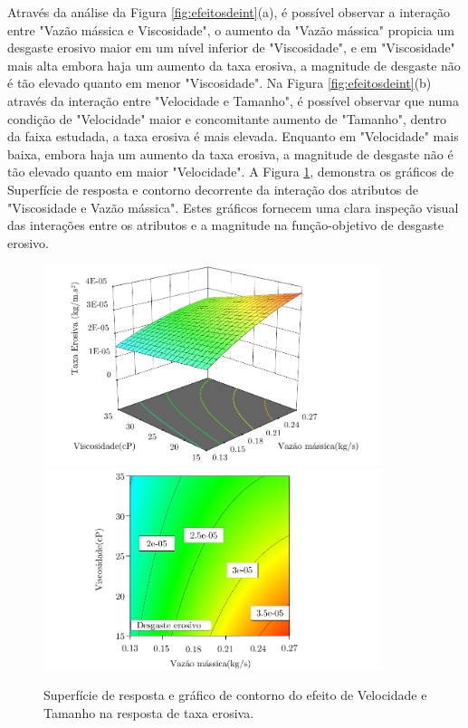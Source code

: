 Através da análise da Figura \ref{fig:efeitosdeint}(a), é possível observar a interação entre "Vazão mássica e Viscosidade", o aumento da "Vazão mássica" propicia um desgaste erosivo maior em um nível inferior de "Viscosidade", e em "Viscosidade" mais alta embora haja um aumento da taxa erosiva, a magnitude de desgaste não é tão elevado quanto em menor "Viscosidade". Na Figura \ref{fig:efeitosdeint}(b) através da interação entre "Velocidade e Tamanho", é possível observar que numa condição de "Velocidade" maior e concomitante aumento de "Tamanho", dentro da faixa estudada, a taxa erosiva é mais elevada. Enquanto em "Velocidade" mais baixa, embora haja um aumento da taxa erosiva, a magnitude de desgaste não é tão elevado quanto em maior "Velocidade". A Figura \ref{fig:respostaveltam2o}, demonstra os gráficos de Superfície de resposta e contorno decorrente da interação dos atributos de "Viscosidade e Vazão mássica". Estes gráficos fornecem uma clara inspeção visual das interações entre os atributos e a magnitude na função-objetivo de desgaste erosivo.

\begin{figure}[H] 
    \centering  
    \includegraphics[width=0.88\textwidth]{Figuras/superficie2.pdf}  
    \includegraphics[width=0.88\textwidth]{Figuras/contornomassica.pdf}  
    \caption{Superfície de resposta e gráfico de contorno do efeito de Velocidade e Tamanho na resposta de taxa erosiva.}  
    \label{fig:respostaveltam2o}  
\end{figure}

